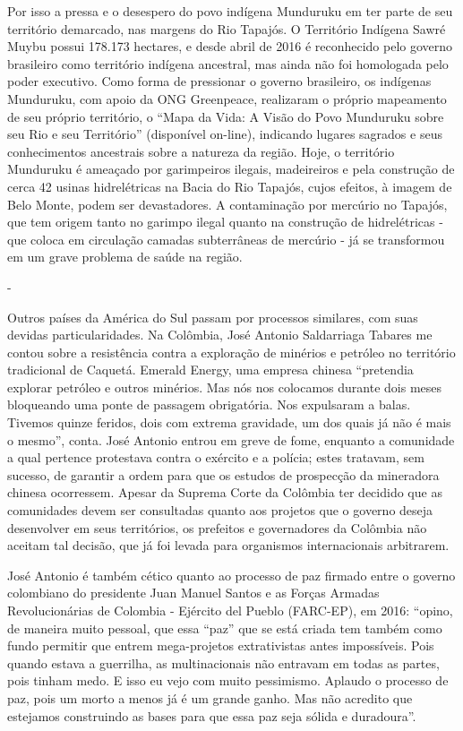 Por isso a pressa e o desespero do povo indígena Munduruku em ter parte
de seu território demarcado, nas margens do Rio Tapajós. O Território
Indígena Sawré Muybu possui 178.173 hectares, e desde abril de 2016 é
reconhecido pelo governo brasileiro como território indígena ancestral,
mas ainda não foi homologada pelo poder executivo. Como forma de
pressionar o governo brasileiro, os indígenas Munduruku, com apoio da
ONG Greenpeace, realizaram o próprio mapeamento de seu próprio
território, o ``Mapa da Vida: A Visão do Povo Munduruku sobre seu Rio e
seu Território'' (disponível on-line), indicando lugares sagrados e seus
conhecimentos ancestrais sobre a natureza da região. Hoje, o território
Munduruku é ameaçado por garimpeiros ilegais, madeireiros e pela
construção de cerca 42 usinas hidrelétricas na Bacia do Rio Tapajós,
cujos efeitos, à imagem de Belo Monte, podem ser devastadores. A
contaminação por mercúrio no Tapajós, que tem origem tanto no garimpo
ilegal quanto na construção de hidrelétricas - que coloca em circulação
camadas subterrâneas de mercúrio - já se transformou em um grave
problema de saúde na região.

-

Outros países da América do Sul passam por processos similares, com suas
devidas particularidades. Na Colômbia, José Antonio Saldarriaga Tabares
me contou sobre a resistência contra a exploração de minérios e petróleo
no território tradicional de Caquetá. Emerald Energy, uma empresa
chinesa ``pretendia explorar petróleo e outros minérios. Mas nós nos
colocamos durante dois meses bloqueando uma ponte de passagem
obrigatória. Nos expulsaram a balas. Tivemos quinze feridos, dois com
extrema gravidade, um dos quais já não é mais o mesmo'', conta. José
Antonio entrou em greve de fome, enquanto a comunidade a qual pertence
protestava contra o exército e a polícia; estes tratavam, sem sucesso,
de garantir a ordem para que os estudos de prospecção da mineradora
chinesa ocorressem. Apesar da Suprema Corte da Colômbia ter decidido que
as comunidades devem ser consultadas quanto aos projetos que o governo
deseja desenvolver em seus territórios, os prefeitos e governadores da
Colômbia não aceitam tal decisão, que já foi levada para organismos
internacionais arbitrarem.

José Antonio é também cético quanto ao processo de paz firmado entre o
governo colombiano do presidente Juan Manuel Santos e as Forças Armadas
Revolucionárias de Colombia - Ejército del Pueblo (FARC-EP), em 2016:
``opino, de maneira muito pessoal, que essa ``paz'' que se está criada
tem também como fundo permitir que entrem mega-projetos extrativistas
antes impossíveis. Pois quando estava a guerrilha, as multinacionais não
entravam em todas as partes, pois tinham medo. E isso eu vejo com muito
pessimismo. Aplaudo o processo de paz, pois um morto a menos já é um
grande ganho. Mas não acredito que estejamos construindo as bases para
que essa paz seja sólida e duradoura''.

